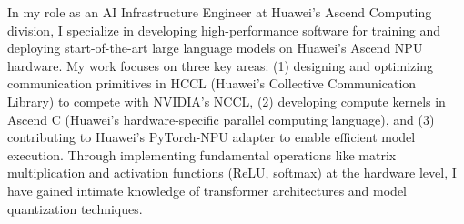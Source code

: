 \documentclass{article}
\begin{document}

In my role as an AI Infrastructure Engineer at Huawei's Ascend Computing division, I specialize in developing high-performance software for training and deploying start-of-the-art large language models on Huawei's Ascend NPU hardware. My work focuses on three key areas: (1) designing and optimizing communication primitives in HCCL (Huawei's Collective Communication Library) to compete with NVIDIA's NCCL, (2) developing compute kernels in Ascend C (Huawei's hardware-specific parallel computing language), and (3) contributing to Huawei's PyTorch-NPU adapter to enable efficient model execution. Through implementing fundamental operations like matrix multiplication and activation functions (ReLU, softmax) at the hardware level, I have gained intimate knowledge of transformer architectures and model quantization techniques.
\end{document}
